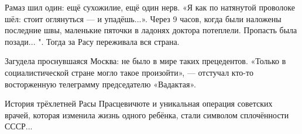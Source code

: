 Рамаз шил один: ещё сухожилие, ещё один нерв. «Я как по натянутой проволоке
шёл: стоит оглянуться — и упадёшь...». Через 9 часов, когда были наложены
последние швы, маленькие пяточки в ладонях доктора потеплели. Пропасть была
позади... ". Тогда за Расу переживала вся страна.

Загудела проснувшаяся Москва: не было в мире таких прецедентов. «Только в
социалистической стране могло такое произойти», — отстучал кто-то восторженную
телеграмму председателю «Вадактая».

История трёхлетней Расы Прасцевичюте и уникальная операция советских врачей,
которая изменила жизнь одного ребёнка, стали символом сплочённости СССР...
